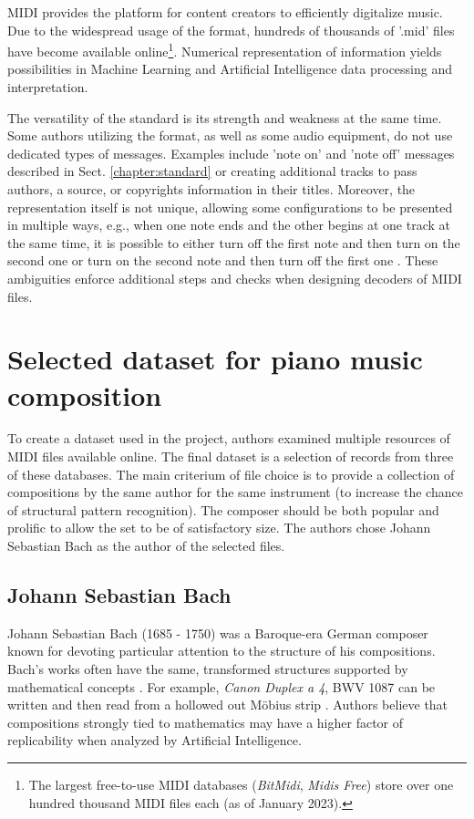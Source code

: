 \documentclass[a4paper, 11pt, twoside]{report}
\theoremstyle{definition}
\begin{document}
MIDI provides the platform for content creators to efficiently digitalize music. Due to the widespread usage of the format, hundreds of thousands of '.mid' files have become available online\footnote{The largest free-to-use MIDI databases (\textit{BitMidi}, \textit{Midis Free}) store over one hundred thousand MIDI files each (as of January 2023).}. Numerical representation of information yields possibilities in Machine Learning and Artificial Intelligence data processing and interpretation. \par
The versatility of the standard is its strength and weakness at the same time. Some authors utilizing the format, as well as some audio equipment, do not use dedicated types of messages. Examples include 'note on' and 'note off' messages described in Sect. \ref{chapter:standard} or creating additional tracks to pass authors, a source, or copyrights information in their titles. Moreover, the representation itself is not unique, allowing some configurations to be presented in multiple ways, e.g., when one note ends and the other begins at one track at the same time, it is possible to either turn off the first note and then turn on the second one or turn on the second note and then turn off the first one \cite{MIDI1_spec}. These ambiguities enforce additional steps and checks when designing decoders of MIDI files. \par


\section{Selected dataset for piano music composition}

To create a dataset used in the project, authors examined multiple resources of MIDI files available online. The final dataset is a selection of records from three of these databases. The main criterium of file choice is to provide a collection of compositions by the same author for the same instrument (to increase the chance of structural pattern recognition). The composer should be both popular and prolific to allow the set to be of satisfactory size. The authors chose Johann Sebastian Bach as the author of the selected files. \par

\subsection{Johann Sebastian Bach}

Johann Sebastian Bach (1685 - 1750) was a Baroque-era German composer known for devoting particular attention to the structure of his compositions. Bach's works often have the same, transformed structures supported by mathematical concepts \cite{Bach}. For example, \textit{Canon Duplex a 4}, BWV 1087 can be written and then read from a hollowed out Möbius strip \cite{Mobius}. Authors believe that compositions strongly tied to mathematics may have a higher factor of replicability when analyzed by Artificial Intelligence. \par
\end{document}
